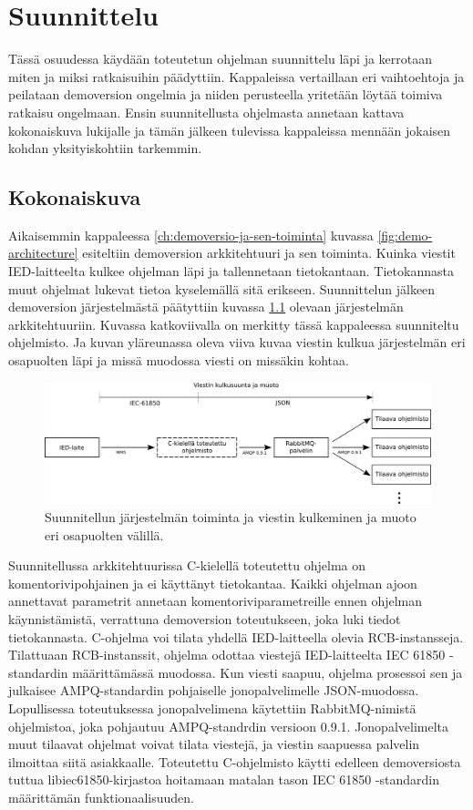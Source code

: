 \chapter{Suunnittelu}
\label{ch:suunnittelu}
Tässä osuudessa käydään toteutetun ohjelman suunnittelu läpi ja kerrotaan miten ja miksi ratkaisuihin päädyttiin. Kappaleissa vertaillaan eri vaihtoehtoja ja peilataan demoversion ongelmia ja niiden perusteella yritetään löytää toimiva ratkaisu ongelmaan. Ensin suunnitellusta ohjelmasta annetaan kattava kokonaiskuva lukijalle ja tämän jälkeen tulevissa kappaleissa mennään jokaisen kohdan yksityiskohtiin tarkemmin.


\section{Kokonaiskuva}
Aikaisemmin kappaleessa \ref{ch:demoversio-ja-sen-toiminta} kuvassa \ref{fig:demo-architecture} esiteltiin demoversion arkkitehtuuri ja sen toiminta. Kuinka viestit IED-laitteelta kulkee ohjelman läpi ja tallennetaan tietokantaan. Tietokannasta muut ohjelmat lukevat tietoa kyselemällä sitä erikseen. Suunnittelun jälkeen demoversion järjestelmästä päätyttiin kuvassa \ref{fig:planned-system-architecture} olevaan järjestelmän arkkitehtuuriin. Kuvassa katkoviivalla on merkitty tässä kappaleessa suunniteltu ohjelmisto. Ja kuvan yläreunassa oleva viiva kuvaa viestin kulkua järjestelmän eri osapuolten läpi ja missä muodossa viesti on missäkin kohtaa.

\begin{figure}
	\includegraphics[width=1\textwidth]{pictures/planned-system-architecture.png}
	\caption{Suunnitellun järjestelmän toiminta ja viestin kulkeminen ja muoto eri osapuolten välillä.}
	\label{fig:planned-system-architecture}
\end{figure}

Suunnitellussa arkkitehtuurissa C-kielellä toteutettu ohjelma on komentorivipohjainen ja ei käyttänyt tietokantaa. Kaikki ohjelman ajoon annettavat parametrit annetaan komentoriviparametreille ennen ohjelman käynnistämistä, verrattuna demoversion toteutukseen, joka luki tiedot tietokannasta. C-ohjelma voi tilata yhdellä IED-laitteella olevia RCB-instansseja. Tilattuaan RCB-instanssit, ohjelma odottaa viestejä IED-laitteelta IEC 61850 -standardin määrittämässä muodossa. Kun viesti saapuu, ohjelma prosessoi sen ja julkaisee AMPQ-standardin pohjaiselle jonopalvelimelle JSON-muodossa. Lopullisessa toteutuksessa jonopalvelimena käytettiin RabbitMQ-nimistä ohjelmistoa, joka pohjautuu AMPQ-standrdin versioon 0.9.1. Jonopalvelimelta muut tilaavat ohjelmat voivat tilata viestejä, ja viestin saapuessa palvelin ilmoittaa siitä asiakkaalle. Toteutettu C-ohjelmisto käytti edelleen demoversiosta tuttua libiec61850-kirjastoa hoitamaan matalan tason IEC 61850 -standardin määrittämän funktionaalisuuden.


